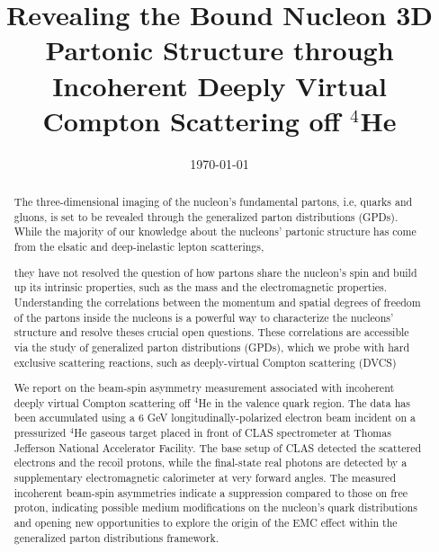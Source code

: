 \documentclass[twocolumn,nofootinbib,showpacs,prl,superscriptaddress,secnumarabic,amssymb,nobibnotes,aps,floatfix]{revtex4}
\begin{document}

\title{Revealing the Bound Nucleon 3D Partonic Structure through Incoherent 
Deeply Virtual Compton Scattering off $^4$He}



%
\date{\today}
\begin{abstract}
The three-dimensional imaging of the nucleon's fundamental partons, i.e, quarks 
and gluons, is set to be revealed through the generalized parton distributions 
(GPDs). While the majority of our knowledge about the nucleons' partonic 
structure has come from the elsatic and deep-inelastic lepton scatterings, 



they have not resolved the question of how partons share the nucleon’s spin and 
build up its intrinsic properties, such as the mass and the electromagnetic 
properties. Understanding the correlations between the momentum and spatial 
degrees of freedom of the partons inside the nucleons is a powerful way to 
characterize the nucleons’ structure and resolve theses crucial open
questions. These correlations are accessible via the study of generalized 
parton distributions
(GPDs), which we probe with hard exclusive scattering reactions, such as 
deeply-virtual
Compton scattering (DVCS)




We report on the beam-spin asymmetry measurement associated with incoherent 
deeply virtual Compton scattering off $^4$He in the valence quark region.  The 
data has been accumulated using a 6 GeV longitudinally-polarized electron beam 
incident on a pressurized $^4$He gaseous target placed in front of CLAS 
spectrometer at Thomas Jefferson National Accelerator Facility. The base setup 
of CLAS detected the scattered electrons and the recoil protons, while the 
final-state real photons are detected by a supplementary electromagnetic 
calorimeter at very forward angles.  The measured incoherent beam-spin 
asymmetries indicate a suppression compared to those on free proton, indicating 
possible medium modifications on the nucleon's quark distributions and opening 
new opportunities to explore the origin of the EMC effect within the 
generalized parton distributions framework. 








\end{abstract}
\end{document}
